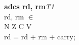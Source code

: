 


\begin{instructionblock}{\imagewidth}%
    \textbf{adcs rd, rm}\hfill\textit{T1}\\
    rd, rm $\in$ \baseregisters\\
    {N Z C V}\\
    rd = rd + rm + carry;
\end{instructionblock}


